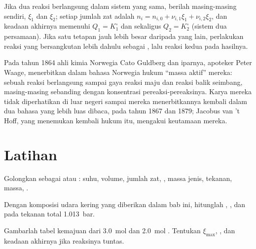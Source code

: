 \begin{method}\label{met:b1:extent-q-and-k:two-reactions}
Jika dua reaksi berlangsung dalam sistem yang sama, berilah masing-masing
 sendiri, $\xi_1$ dan $\xi_2$; setiap jumlah zat adalah
$n_i = n_{i,0} + \nu_{i,1}\xi_1
+ \nu_{i,2}\xi_2$, dan keadaan akhirnya memenuhi $Q_1 = K_1^\circ$ dan
sekaligus $Q_2 = K_2^\circ$ (sistem dua persamaan). Jika satu tetapan jauh
lebih besar daripada yang lain, perlakukan reaksi yang bersangkutan lebih
dahulu sebagai , lalu reaksi kedua pada hasilnya.
\end{method}

\begin{history}
Pada tahun 1864 ahli kimia Norwegia Cato Guldberg dan iparnya, apoteker
Peter Waage, menerbitkan dalam bahasa Norwegia hukum ``massa aktif''
mereka: sebuah reaksi berlangsung sampai gaya reaksi maju dan reaksi
balik seimbang, masing-masing sebanding dengan konsentrasi
pereaksi-pereaksinya. Karya mereka tidak diperhatikan di luar negeri
sampai mereka menerbitkannya kembali dalam dua bahasa yang lebih luas
dibaca, pada tahun 1867 dan 1879; Jacobus van 't Hoff, yang menemukan
kembali hukum itu, mengakui keutamaan mereka.
\end{history}

\section{Latihan}

\begin{exercise}[$\star$]\label{exo:b1:extent-q-and-k:1}
Golongkan sebagai  atau : suhu, volume, jumlah zat,
, massa jenis, tekanan, massa, .
\end{exercise}

\begin{exercise}[$\star$]\label{exo:b1:extent-q-and-k:2}
Dengan komposisi udara kering yang diberikan dalam bab ini, hitunglah
 , , dan  pada tekanan total
\qty{1.013}{bar}.
\end{exercise}

\begin{exercise}[$\star$]\label{exo:b1:extent-q-and-k:3}
Gambarlah tabel kemajuan  dari \qty{3.0}{mol}
 dan \qty{2.0}{mol} . Tentukan $\xi_{\max}$, , dan keadaan akhirnya jika reaksinya tuntas.
\end{exercise}

